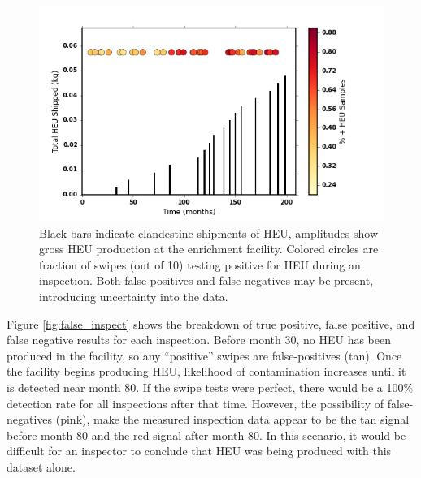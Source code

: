 \begin{figure}%
\begin{center}
\includegraphics[natwidth=162bp,natheight=227bp, scale=0.6]{./figs/mm_5enrich_tinytails_inspinspect_ship.png}
\end{center}
\caption{Black bars indicate clandestine shipments of \gls{HEU}, amplitudes show gross \gls{HEU} production at the enrichment facility.  Colored circles are fraction of swipes (out of 10) testing positive for \gls{HEU} during an inspection. Both false positives and false negatives may be present, introducing uncertainty into the data.}
\label{fig:inspect}
\end{figure}

Figure \ref{fig:false_inspect} shows the breakdown of true positive, false positive, and false negative results for each inspection.  Before month 30, no \gls{HEU} has been produced in the facility, so any ``positive'' swipes are false-positives (tan). Once the facility begins producing \gls{HEU}, likelihood of contamination increases until it is detected near month 80. If the swipe tests were perfect, there would be a 100\% detection rate for all inspections after that time. However, the possibility of false-negatives (pink), make the measured inspection data appear to be the tan signal before month 80 and the red signal after month 80.  In this scenario, it would be difficult for an inspector to conclude that \gls{HEU} was being produced with this dataset alone.

